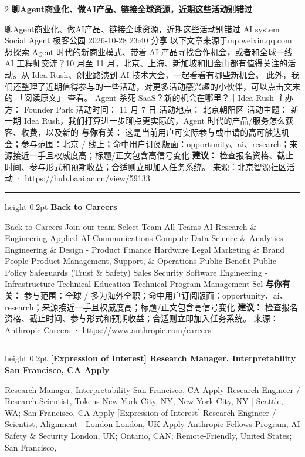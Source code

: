 \documentclass[10.5pt]{ctexart}
\begin{document}
\begin{multicols}{2}
{\large\bfseries 聊Agent商业化、做AI产品、链接全球资源，近期这些活动别错过}\par
聊Agent商业化、做AI产品、链接全球资源，近期这些活动别错过 AI system Social Agent 极客公园 2026-10-28 23:40 分享 以下文章来源于mp.weixin.qq.com 想探索 Agent 时代的新商业模式、带着 AI 产品寻找合作机会，或者和全球一线 AI 工程师交流？10 月至 11 月，北京、上海、新加坡和旧金山都有值得关注的活 动。从 Idea Rush、创业路演到 AI 技术大会，一起看看有哪些新机会。 此外，我们还整理了近期值得参与的一些活动，对更多活动感兴趣的小伙伴，可以点击文末的 「阅读原文」 查看。 Agent 杀死 SaaS？新的机会在哪里？｜Idea Rush 主办方： Founder Park 活动时间： 11 月 7 日 活动地点： 北京朝阳区 活动主题： 新一期 Idea Rush，我们打算进一步聊点更实际的，Agent 时代的产品/服务怎么获客、收费，以及新的
\textbf{与你有关：} 这是当前用户可实际参与或申请的高可触达机会；参与范围：北京 / 线上；命中用户订阅版面：opportunity、ai、research；来源接近一手且权威度高；标题/正文包含高信号变化
\textbf{建议：} 检查报名资格、截止时间、参与形式和预期收益；合适则立即加入任务系统。
{\footnotesize\color{ormuted} 来源：北京智源社区活动 · \url{https://hub.baai.ac.cn/view/59133}}
\vspace{2mm}
\hrule height 0.2pt
\vspace{2mm}
{\large\bfseries Back to Careers}\par
Back to Careers Join our team Select Team All Teams AI Research \& Engineering Applied AI Communications Compute Data Science \& Analytics Engineering \& Design - Product Finance Hardware Legal Marketing \& Brand People Product Management, Support, \& Operations Public Benefit Public Policy Safeguards (Trust \& Safety) Sales Security Software Engineering - Infrastructure Technical Education Technical Program Management Sel
\textbf{与你有关：} 参与范围：全球 / 多为海外全职；命中用户订阅版面：opportunity、ai、research；来源接近一手且权威度高；标题/正文包含高信号变化
\textbf{建议：} 检查报名资格、截止时间、参与形式和预期收益；合适则立即加入任务系统。
{\footnotesize\color{ormuted} 来源：Anthropic Careers · \url{https://www.anthropic.com/careers}}
\vspace{2mm}
\hrule height 0.2pt
\vspace{2mm}
{\large\bfseries [Expression of Interest] Research Manager, Interpretability San Francisco, CA Apply}\par
[Expression of Interest] Research Manager, Interpretability San Francisco, CA Apply Research Engineer / Research Scientist, Tokens New York City, NY; New York City, NY | Seattle, WA; San Francisco, CA Apply [Expression of Interest] Research Engineer / Scientist, Alignment - London London, UK Apply Anthropic Fellows Program, AI Safety \& Security London, UK; Ontario, CAN; Remote-Friendly, United States; San Francisco, 

\end{multicols}
\end{document}
